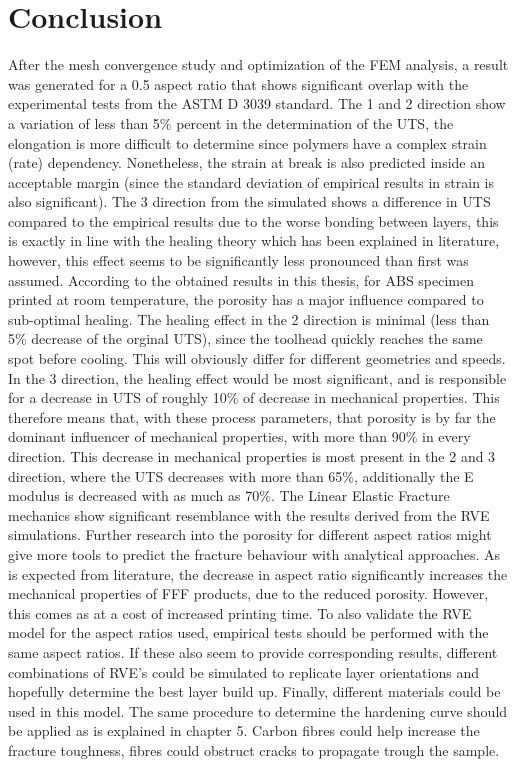\section{Conclusion}
After the mesh convergence study and optimization of the FEM analysis, a result was generated for a 0.5 aspect ratio that shows significant overlap with the experimental tests from the ASTM D 3039 standard. The 1 and 2 direction show a variation of less than 5\% percent in the determination of the UTS, the elongation is more difficult to determine since polymers have a complex strain (rate) dependency. Nonetheless, the strain at break is also predicted inside an acceptable margin (since the standard deviation of empirical results in strain is also significant). The 3 direction from the simulated shows a difference in UTS compared to the empirical results due to the worse bonding between layers, this is exactly in line with the healing theory which has been explained in literature, however, this effect seems to be significantly less pronounced than first was assumed. According to the obtained results in this thesis, for ABS specimen printed at room temperature, the porosity has a major influence compared to sub-optimal healing.  The healing effect in the 2 direction is minimal (less than 5\% decrease of the orginal UTS), since the toolhead quickly reaches the same spot before cooling. This will obviously differ for different geometries and speeds. In the 3 direction, the healing effect would be most significant, and is responsible for a decrease in UTS of roughly 10\% of decrease in mechanical properties. This therefore means that, with these process parameters, that porosity is by far the dominant influencer of mechanical properties, with more than 90\% in every direction. This decrease in mechanical properties is most present in the 2 and 3 direction, where the UTS decreases with more than 65\%, additionally the E modulus is decreased with as much as 70\%. 
The Linear Elastic Fracture mechanics show significant resemblance with the results derived from the RVE simulations. Further research into the porosity for different aspect ratios might give more tools to predict the fracture behaviour with analytical approaches. 
As is expected from literature, the decrease in aspect ratio significantly increases the mechanical properties of FFF products, due to the reduced porosity. However, this comes as at a cost of increased printing time.
To also validate the RVE model for the aspect ratios used, empirical tests should be performed with the same aspect ratios. If these also seem to provide corresponding results, different combinations of RVE's could be simulated to replicate layer orientations and hopefully determine the best layer build up. 
Finally, different materials could be used in this model. The same procedure to determine the hardening curve should be applied as is explained in chapter 5. Carbon fibres could help increase the fracture toughness, fibres could obstruct cracks to propagate trough the sample.  



